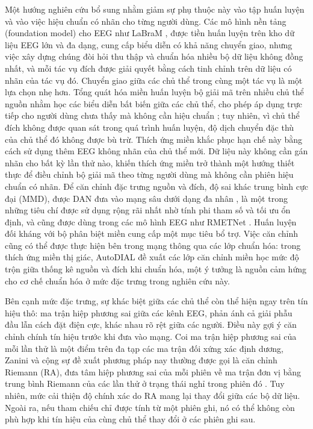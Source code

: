 \documentclass[preprint,12pt]{elsarticle}
\begin{document}
Một hướng nghiên cứu bổ sung nhằm giảm sự phụ thuộc này vào tập huấn luyện và vào việc hiệu chuẩn có nhãn cho từng người dùng. Các mô hình nền tảng (foundation model) cho EEG như LaBraM \cite{jiang2024labram}, được tiền huấn luyện trên kho dữ liệu EEG lớn và đa dạng, cung cấp biểu diễn có khả năng chuyển giao, nhưng việc xây dựng chúng đòi hỏi thu thập và chuẩn hóa nhiều bộ dữ liệu không đồng nhất, và mỗi tác vụ đích được giải quyết bằng cách tinh chỉnh trên dữ liệu có nhãn của tác vụ đó. Chuyển giao giữa các chủ thể trong cùng một tác vụ là một lựa chọn nhẹ hơn. Tổng quát hóa miền huấn luyện bộ giải mã trên nhiều chủ thể nguồn nhằm học các biểu diễn bất biến giữa các chủ thể, cho phép áp dụng trực tiếp cho người dùng chưa thấy mà không cần hiệu chuẩn \cite{zhong2025eegdg}; tuy nhiên, vì chủ thể đích không được quan sát trong quá trình huấn luyện, độ dịch chuyển đặc thù của chủ thể đó không được bù trừ. Thích ứng miền khắc phục hạn chế này bằng cách sử dụng thêm EEG không nhãn của chủ thể mới. Dữ liệu này không cần gán nhãn cho bất kỳ lần thử nào, khiến thích ứng miền trở thành một hướng thiết thực để điều chỉnh bộ giải mã theo từng người dùng mà không cần phiên hiệu chuẩn có nhãn. Để căn chỉnh đặc trưng nguồn và đích, độ sai khác trung bình cực đại (MMD), được DAN đưa vào mạng sâu dưới dạng đa nhân \cite{long2015dan}, là một trong những tiêu chí được sử dụng rộng rãi nhất nhờ tính phi tham số và tối ưu ổn định, và cũng được dùng trong các mô hình EEG như RMETNet \cite{zhao2026rmetnet}. Huấn luyện đối kháng với bộ phân biệt miền \cite{ganin2016dann,tang2020cdan} cung cấp một mục tiêu bổ trợ. Việc căn chỉnh cũng có thể được thực hiện bên trong mạng thông qua các lớp chuẩn hóa: trong thích ứng miền thị giác, AutoDIAL \cite{carlucci2017autodial} đề xuất các lớp căn chỉnh miền học mức độ trộn giữa thống kê nguồn và đích khi chuẩn hóa, một ý tưởng là nguồn cảm hứng cho cơ chế chuẩn hóa ở mức đặc trưng trong nghiên cứu này.

Bên cạnh mức đặc trưng, sự khác biệt giữa các chủ thể còn thể hiện ngay trên tín hiệu thô: ma trận hiệp phương sai giữa các kênh EEG, phản ánh cả giải phẫu đầu lẫn cách đặt điện cực, khác nhau rõ rệt giữa các người. Điều này gợi ý căn chỉnh chính tín hiệu trước khi đưa vào mạng. Coi ma trận hiệp phương sai của mỗi lần thử là một điểm trên đa tạp các ma trận đối xứng xác định dương, Zanini và cộng sự đề xuất phương pháp nay thường được gọi là căn chỉnh Riemann (RA), đưa tâm hiệp phương sai của mỗi phiên về ma trận đơn vị bằng trung bình Riemann của các lần thử ở trạng thái nghỉ trong phiên đó \cite{zanini2018riemannian}. Tuy nhiên, mức cải thiện độ chính xác do RA mang lại thay đổi giữa các bộ dữ liệu. Ngoài ra, nếu tham chiếu chỉ được tính từ một phiên ghi, nó có thể không còn phù hợp khi tín hiệu của cùng chủ thể thay đổi ở các phiên ghi sau.
\end{document}
